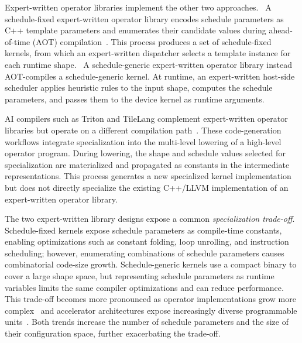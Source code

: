 Expert-written operator libraries implement the other two approaches.
~A schedule-fixed expert-written operator library encodes schedule parameters as C++ template parameters and enumerates their candidate values during ahead-of-time (AOT) compilation~\cite{nvidia2017cutlass,ye2025flashinfer,dao2024flashattention2}. This process produces a set of schedule-fixed kernels, from which an expert-written dispatcher selects a template instance for each runtime shape.
~A schedule-generic expert-written operator library instead AOT-compiles a schedule-generic kernel. At runtime, an expert-written host-side scheduler applies heuristic rules to the input shape, computes the schedule parameters, and passes them to the device kernel as runtime arguments.

AI compilers such as Triton and TileLang complement expert-written operator libraries but operate on a different compilation path~\cite{tillet2019triton,tilelang}.
These code-generation workflows integrate specialization into the multi-level lowering of a high-level operator program. During lowering, the shape and schedule values selected for specialization are materialized and propagated as constants in the intermediate representations. This process generates a new specialized kernel implementation but does not directly specialize the existing C++/LLVM implementation of an expert-written operator library.

The two expert-written library designs expose a common \emph{specialization trade-off}. Schedule-fixed kernels expose schedule parameters as compile-time constants, enabling optimizations such as constant folding, loop unrolling, and instruction scheduling; however, enumerating combinations of schedule parameters causes combinatorial code-size growth.
Schedule-generic kernels use a compact binary to cover a large shape space, but representing schedule parameters as runtime variables limits the same compiler optimizations and can reduce performance.
This trade-off becomes more pronounced as operator implementations grow more complex~\cite{dao2024flashattention2,ye2025flashinfer} and accelerator architectures expose increasingly diverse programmable units~\cite{liao2019davinci,jouppi2023tpu}. Both trends increase the number of schedule parameters and the size of their configuration space, further exacerbating the trade-off.

